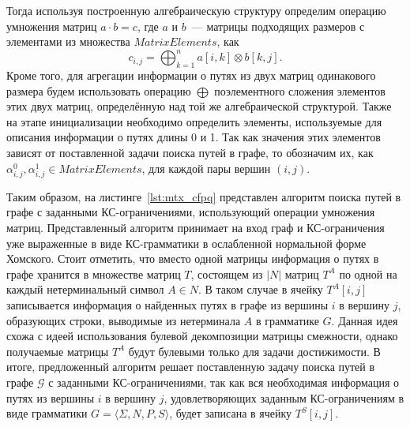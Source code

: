 Тогда используя построенную алгебраическую структуру определим операцию умножения матриц \mbox{$a \cdot b = c$}, где $a$ и $b$~--- матрицы подходящих размеров с элементами из множества $\textit{MatrixElements}$, как $$c_{i, j} = \bigoplus^{n}_{k=1}{a[i, k] \otimes b[k, j]}.$$ Кроме того, для агрегации информации о путях из двух матриц одинакового размера будем использовать операцию $\bigoplus$ поэлементного сложения элементов этих двух матриц, определённую над той же алгебраической структурой. Также на этапе инициализации необходимо определить элементы, используемые для описания информации о путях длины 0 и 1. Так как значения этих элементов зависят от поставленной задачи поиска путей в графе, то обозначим их, как $\alpha^0_{i, j}, \alpha^1_{i, j} \in \textit{MatrixElements}$, для каждой пары вершин $(i, j)$.

Таким образом, на листинге~\ref{lst:mtx_cfpq} представлен алгоритм поиска путей в графе с заданными КС-ограничениями, использующий операции умножения матриц. Представленный алгоритм принимает на вход граф и КС-ограничения уже выраженные в виде КС-грамматики в ослабленной нормальной форме Хомского. Стоит отметить, что вместо одной матрицы информация о путях в графе хранится в множестве матриц $T$, состоящем из $|N|$ матриц $T^A$ по одной на каждый нетерминальный символ $A \in N$. В таком случае в ячейку $T^A[i, j]$ записывается информация о найденных путях в графе из вершины $i$ в вершину $j$, образующих строки, выводимые из нетерминала $A$ в грамматике $G$. Данная идея схожа с идеей использования булевой декомпозиции матрицы смежности, однако получаемые матрицы $T^A$ будут булевыми только для задачи достижимости. В итоге, предложенный алгоритм решает поставленную задачу поиска путей в графе $\mathcal{G}$ с заданными КС-ограничениями, так как вся необходимая информация о путях из вершины $i$ в вершину $j$, удовлетворяющих заданным КС-ограничениям в виде грамматики $G = \langle \Sigma, N, P, S\rangle$, будет записана в ячейку $T^S[i, j]$.


